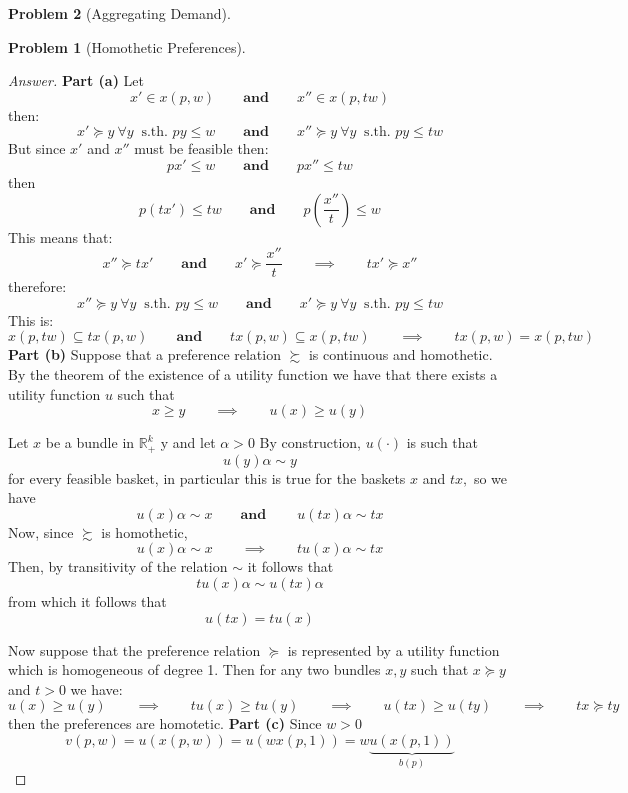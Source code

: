 \documentclass{article}
\theoremstyle{definition}
\newtheorem{problem}{Problem}
\newcommand{\qiq}{\qquad \implies \qquad}
\newcommand{\qaq}{\qquad \textbf{and} \qquad}
\begin{document}
\begin{problem}[Aggregating Demand]
\begin{problem}[Homothetic Preferences]
\end{problem}

\begin{proof}[Answer]
\textbf{Part (a)}
Let
$$x'\in x(p,w) \qaq  x''\in x(p,tw)$$
then:
$$x'\succeq y \: \forall y \: \text{ s.th. } py\leq w \qaq  x''\succeq y \: \forall y \: \text{ s.th. } py\leq tw$$
But since $x'$ and $x''$ must be feasible then:
$$p x' \leq w \qaq p x'' \leq tw $$
then
$$p(t x') \leq t w \qaq p \left(\frac{x''}{t}\right) \leq w $$
This means that:
$$x'' \succeq t x' \qaq x'\succeq \frac{x''}{t} \qiq tx' \succeq x''$$
therefore:
$$x''\succeq y \: \forall y \: \text{ s.th. } py\leq w \qaq  x'\succeq y \: \forall y \: \text{ s.th. } py\leq tw$$
This is:
$$x(p,tw) \subseteq tx(p,w) \qaq tx(p,w) \subseteq x(p,tw) \qiq tx(p,w) = x(p,tw)$$
\textbf{Part (b)}
Suppose that a preference relation $ \succsim $ is continuous and homothetic. By the theorem of the existence of a utility function we have that there exists a utility function $u$ such that 
$$ x \geq y \qiq u(x) \geq u(y) $$

Let $x$ be a bundle in $\mathbb{R}_{+}^{k}$ y and let $\alpha>0 $ By construction, $u(\cdot )$ is such that $$u(y) \alpha \sim y $$ for every feasible basket, in particular this is true for the baskets $ x $ and $ t x, $ so we have $$u(x) \alpha \sim x \qaq \ u(t x)\alpha \sim  tx $$ Now, since $ \succsim $ is homothetic, $$ u(x) \alpha \sim x \qiq t u (x) \alpha \sim tx $$ Then, by transitivity of the relation $ \sim $ it follows that $$ t u (x) \alpha \sim u (t x) \alpha$$ from which it follows that 
$$ u(t x) = tu(x) $$

Now suppose that the preference relation $\succeq$ is represented by a utility function which is homogeneous of degree 1. Then for any two bundles $x,y$ such that $x\succeq y$ and $t>0$ we have:
$$u(x)\geq u(y) \qiq tu(x)\geq tu(y)  \qiq u(tx)\geq u(ty) \qiq tx \succeq ty$$
then the preferences are homotetic.
\textbf{Part (c)} Since $w> 0$
$$v(p,w) = u(x(p,w)) = u(wx(p,1))=w \underbrace{u(x(p,1))}_{b(p)}$$
\end{proof}


\end{problem}
\end{document}
